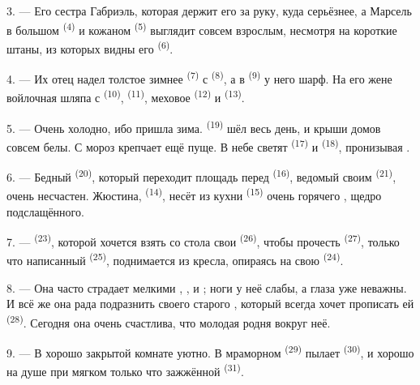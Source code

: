 3. --- Его сестра Габриэль, которая держит его за руку, куда серьёзнее, а
Марсель в большом  \textsuperscript{(4)} и кожаном 
\textsuperscript{(5)} выглядит совсем взрослым, несмотря на короткие штаны, из
которых видны его  \textsuperscript{(6)}.

4. --- Их отец надел толстое зимнее  \textsuperscript{(7)} с
 \textsuperscript{(8)}, а в 
\textsuperscript{(9)} у него шарф. На его жене войлочная шляпа с 
\textsuperscript{(10)},  \textsuperscript{(11)}, меховое 
\textsuperscript{(12)} и  \textsuperscript{(13)}.

5. --- Очень холодно, ибо пришла зима.  \textsuperscript{(19)} шёл
весь день, и крыши домов совсем белы. С  мороз крепчает ещё
пуще. В небе светят  \textsuperscript{(17)} и 
\textsuperscript{(18)}, пронизывая .

\VUsaut{4.2mm}
\VUsaut{3.0mm}

6. --- Бедный  \textsuperscript{(20)}, который переходит площадь
перед  \textsuperscript{(16)}, ведомый своим 
\textsuperscript{(21)}, очень несчастен. Жюстина, 
\textsuperscript{(14)}, несёт из кухни  \textsuperscript{(15)} очень
горячего , щедро подслащённого.

7. ---  \textsuperscript{(23)}, которой хочется взять со стола
свои  \textsuperscript{(26)}, чтобы прочесть 
\textsuperscript{(27)}, только что написанный  \textsuperscript{(25)},
поднимается из кресла, опираясь на свою  \textsuperscript{(24)}.

8. --- Она часто страдает мелкими , ,
 и ; ноги у неё слабы, а глаза уже
неважны. И всё же она рада подразнить своего старого ,
который всегда хочет прописать ей  \textsuperscript{(28)}.
Сегодня она очень счастлива, что молодая родня вокруг неё.

9. --- В хорошо закрытой комнате уютно. В мраморном 
\textsuperscript{(29)} пылает  \textsuperscript{(30)}, и хорошо
на душе при мягком  только что зажжённой 
\textsuperscript{(31)}.

